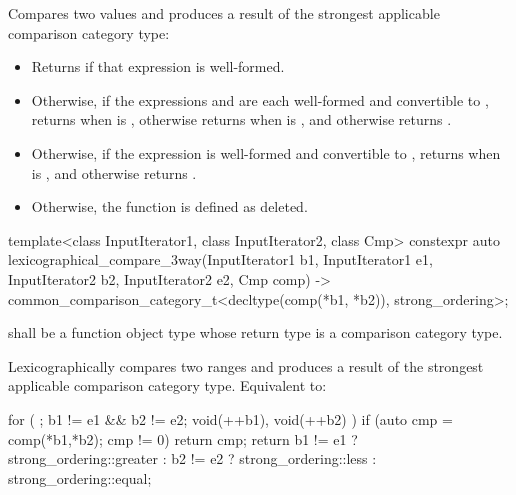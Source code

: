 \begin{itemdescr}
\pnum
\effects
Compares two values and produces a result
of the strongest applicable comparison category type:
\begin{itemize}
\item
  Returns  if that expression is well-formed.
\item
  Otherwise, if the expressions  and 
  are each well-formed and convertible to ,
  returns 
  when  is ,
  otherwise returns 
  when  is ,
  and otherwise returns .
\item
  Otherwise, if the expression 
  is well-formed and convertible to ,
  returns  when  is ,
  and otherwise returns .
\item
  Otherwise, the function is defined as deleted.
\end{itemize}
\end{itemdescr}

%
\begin{itemdecl}
template<class InputIterator1, class InputIterator2, class Cmp>
  constexpr auto
    lexicographical_compare_3way(InputIterator1 b1, InputIterator1 e1,
                                 InputIterator2 b2, InputIterator2 e2,
                                 Cmp comp)
      -> common_comparison_category_t<decltype(comp(*b1, *b2)), strong_ordering>;
\end{itemdecl}

\begin{itemdescr}
\pnum
\requires
{} shall be a function object type
whose return type is a comparison category type.

\pnum
\effects
Lexicographically compares two ranges and
produces a result of the strongest applicable comparison category type.
Equivalent to:
\begin{codeblock}
for ( ; b1 != e1 && b2 != e2; void(++b1), void(++b2) )
  if (auto cmp = comp(*b1,*b2); cmp != 0)
    return cmp;
return b1 != e1 ? strong_ordering::greater :
       b2 != e2 ? strong_ordering::less :
                  strong_ordering::equal;
\end{codeblock}
\end{itemdescr}

